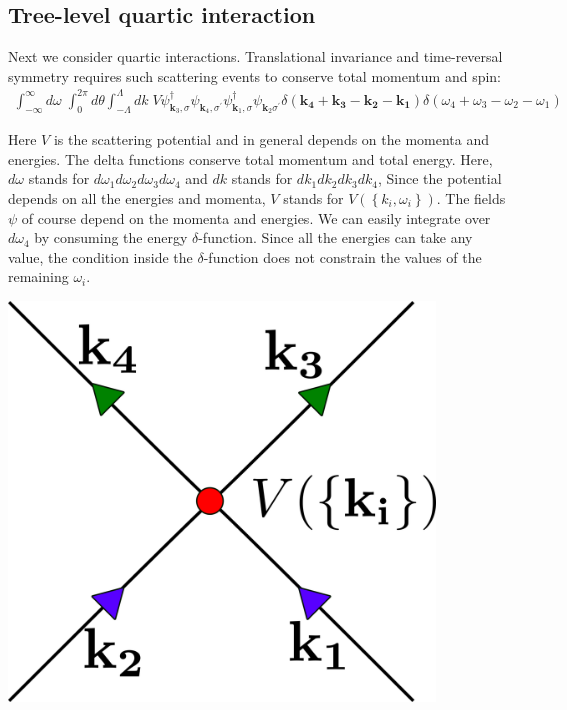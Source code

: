 \documentclass[14pt]{extarticle}
\begin{document}
\subsection{Tree-level quartic interaction}
Next we consider quartic interactions. Translational invariance and time-reversal symmetry requires such scattering events to conserve total momentum and spin:
\begin{equation}\begin{aligned}
\int_{-\infty}^\infty d\omega\;\int_0^{2\pi} d\theta \int_{-\Lambda}^{\Lambda}dk \;V\psi_{\mathbf k_3,\sigma}^\dagger\psi_{\mathbf k_4,\sigma^\prime}\psi_{\mathbf k_1,\sigma}^\dagger\psi_{\mathbf k_2\sigma^\prime} \delta(\mathbf{k_4}+\mathbf{k_3} - \mathbf{k_2} - \mathbf{k_1})\delta({\omega_4}+{\omega_3} - {\omega_2} - {\omega_1})
\end{aligned}\end{equation}
\begin{minipage}{0.45\textwidth}
	Here \(V\) is the scattering potential and in general depends on the momenta and energies. The delta functions conserve total momentum and total energy. Here, \(d\omega\) stands for \(d\omega_1d\omega_2d\omega_3d\omega_4\) and \(dk\) stands for \(dk_1dk_2dk_3dk_4\), Since the potential depends on all the energies and momenta, \(V\) stands for \(V\left(\left\{k_i,\omega_i\right\}\right)\). The fields \(\psi\) of course depend on the momenta and energies. We can easily integrate over \(d\omega_4\) by consuming the energy \(\delta\)-function. Since all the energies can take any value, the condition inside the \(\delta\)-function does not constrain the values of the remaining \(\omega_i\).
\end{minipage}
\hspace*{\fill}
\begin{minipage}{0.45\textwidth}
\begin{center}\includegraphics[width=0.85\textwidth]{./figures/term.png}\end{center}
\end{minipage}\\\\
\end{document}
